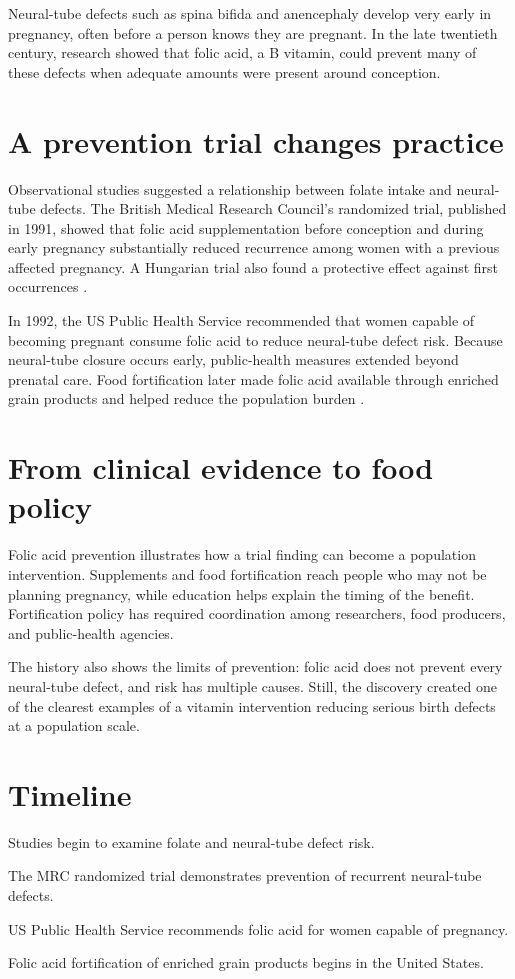 \documentclass[12pt,oneside]{book}
\begin{document}
Neural-tube defects such as spina bifida and anencephaly develop very early in
pregnancy, often before a person knows they are pregnant. In the late
twentieth century, research showed that folic acid, a B vitamin, could prevent
many of these defects when adequate amounts were present around conception.

\section{A prevention trial changes practice}
Observational studies suggested a relationship between folate intake and neural-tube defects. The British Medical Research Council's randomized trial, published in 1991, showed that folic acid supplementation before conception and during early pregnancy substantially reduced recurrence among women with a previous affected pregnancy. A Hungarian trial also found a protective effect against first occurrences \cite{cdcFolicAcidHistory,mrcFolicTrial}.

In 1992, the US Public Health Service recommended that women capable of
becoming pregnant consume folic acid to reduce neural-tube defect risk.
Because neural-tube closure occurs early, public-health measures extended
beyond prenatal care. Food fortification later made folic acid available
through enriched grain products and helped reduce the population burden
\cite{cdcFolicAcidHistory}.

\section{From clinical evidence to food policy}
Folic acid prevention illustrates how a trial finding can become a population intervention. Supplements and food fortification reach people who may not be planning pregnancy, while education helps explain the timing of the benefit. Fortification policy has required coordination among researchers, food producers, and public-health agencies.

The history also shows the limits of prevention: folic acid does not prevent
every neural-tube defect, and risk has multiple causes. Still, the discovery
created one of the clearest examples of a vitamin intervention reducing
serious birth defects at a population scale.

\section*{Timeline}
\begin{description}[leftmargin=2.3cm,style=nextline]
  \item[1960s] Studies begin to examine folate and neural-tube defect risk.
  \item[1991] The MRC randomized trial demonstrates prevention of recurrent neural-tube defects.
  \item[1992] US Public Health Service recommends folic acid for women capable of pregnancy.
  \item[1998] Folic acid fortification of enriched grain products begins in the United States.
\end{description}
\end{document}
